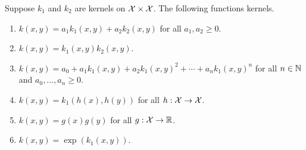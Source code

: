 Suppose \(k_1\) and \(k_2\) are kernels on \(\mathcal{X} \times \mathcal{X}\).
The following functions kernels.
\begin{enumerate}
    \item \label{itm:constructing-kernels-1}
    \(k(x,y) = a_1 k_1(x,y) + a_2 k_2(x,y)\) for all \(a_1, a_2 \geq 0\).
    \item \label{itm:constructing-kernels-2}
    \(k(x,y) = k_1(x,y) k_2(x,y)\).
    \item \label{itm:constructing-kernels-3}
    \(k(x,y) = a_0 + a_1 k_1(x,y) + a_2 k_1(x,y)^2 + \cdots + a_n k_1(x,y)^n\) for all \(n \in \mathbb{N}\) and \(a_0, \dots, a_n \geq 0\).
    \item \label{itm:constructing-kernels-4}
    \(k(x,y) = k_1(h(x),h(y))\) for all \(h : \mathcal{X} \to \mathcal{X}\).
    \item \label{itm:constructing-kernels-5}
    \(k(x,y) = g(x)g(y)\) for all \(g : \mathcal{X} \to \mathbb{R}\).
    \item \label{itm:constructing-kernels-6}
    \(k(x,y) = \exp(k_1(x,y))\).
\end{enumerate}